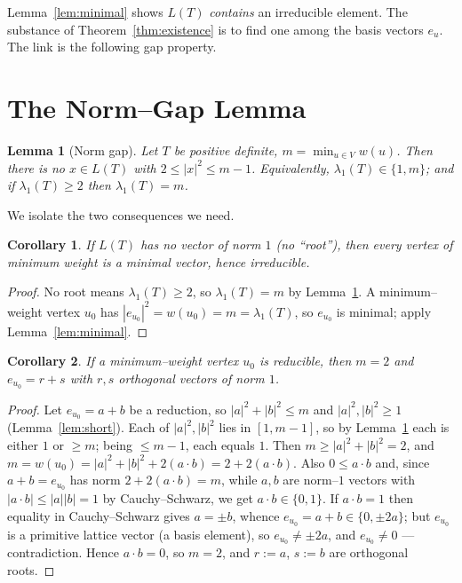 \documentclass{article}
\newtheorem{lemma}{Lemma}
\newtheorem{corollary}{Corollary}
\theoremstyle{definition}
\begin{document}
Lemma~\ref{lem:minimal} shows $L(T)$ \emph{contains} an irreducible element.
The substance of Theorem~\ref{thm:existence} is to find one among the basis
vectors $e_u$.  The link is the following gap property.

\section{The Norm--Gap Lemma}

\begin{lemma}[Norm gap]\label{lem:gap}
Let $T$ be positive definite, $m=\min_{u\in V}w(u)$.  Then there is no
$x\in L(T)$ with $2\leq|x|^2\leq m-1$.  Equivalently, $\lambda_1(T)\in\{1,m\}$;
and if $\lambda_1(T)\geq 2$ then $\lambda_1(T)=m$.
\end{lemma}

We isolate the two consequences we need.

\begin{corollary}\label{cor:noroot}
If $L(T)$ has no vector of norm $1$ \textup{(}no ``root''\textup{)}, then every
vertex of minimum weight is a minimal vector, hence irreducible.
\end{corollary}

\begin{proof}
No root means $\lambda_1(T)\geq 2$, so $\lambda_1(T)=m$ by
Lemma~\ref{lem:gap}.  A minimum--weight vertex $u_0$ has
$|e_{u_0}|^2=w(u_0)=m=\lambda_1(T)$, so $e_{u_0}$ is minimal; apply
Lemma~\ref{lem:minimal}.
\end{proof}

\begin{corollary}\label{cor:m2}
If a minimum--weight vertex $u_0$ is reducible, then $m=2$ and
$e_{u_0}=r+s$ with $r,s$ orthogonal vectors of norm $1$.
\end{corollary}

\begin{proof}
Let $e_{u_0}=a+b$ be a reduction, so $|a|^2+|b|^2\leq m$ and $|a|^2,|b|^2\geq1$
(Lemma~\ref{lem:short}).  Each of $|a|^2,|b|^2$ lies in $[1,m-1]$, so by
Lemma~\ref{lem:gap} each is either $1$ or $\geq m$; being $\leq m-1$, each
equals $1$.  Then $m\geq|a|^2+|b|^2=2$, and
$m=w(u_0)=|a|^2+|b|^2+2(a\cdot b)=2+2(a\cdot b)$.  Also
$0\leq a\cdot b$ and, since $a+b=e_{u_0}$ has norm
$2+2(a\cdot b)=m$, while $a,b$ are norm--$1$ vectors with
$|a\cdot b|\leq|a||b|=1$ by Cauchy--Schwarz, we get $a\cdot b\in\{0,1\}$.  If
$a\cdot b=1$ then equality in Cauchy--Schwarz gives $a=\pm b$, whence
$e_{u_0}=a+b\in\{0,\pm2a\}$; but $e_{u_0}$ is a primitive lattice vector (a basis
element), so $e_{u_0}\neq\pm 2a$, and $e_{u_0}\neq 0$ --- contradiction.  Hence
$a\cdot b=0$, so $m=2$, and $r:=a$, $s:=b$ are orthogonal roots.
\end{proof}
\end{document}
